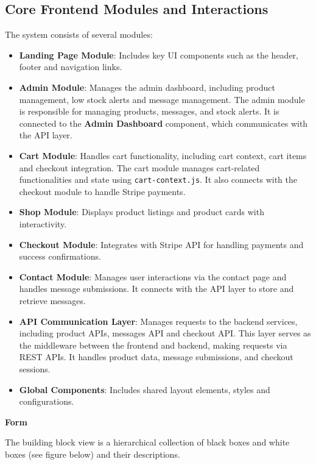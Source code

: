 \subsection{Core Frontend Modules and Interactions}
The system consists of several modules:
\begin{itemize}
    \item \textbf{Landing Page Module}: Includes key UI components such as the header, footer and navigation links.
    \item \textbf{Admin Module}: Manages the admin dashboard, including product management, low stock alerts and message management. The admin module is responsible for managing products, messages, and stock alerts. It is connected to the \textbf{Admin Dashboard} component, which communicates with the API layer.
    \item \textbf{Cart Module}: Handles cart functionality, including cart context, cart items and checkout integration. The cart module manages cart-related functionalities and state using \texttt{cart-context.js}. It also connects with the checkout module to handle Stripe payments.
    \item \textbf{Shop Module}: Displays product listings and product cards with interactivity.
    \item \textbf{Checkout Module}: Integrates with Stripe API for handling payments and success confirmations.
    \item \textbf{Contact Module}: Manages user interactions via the contact page and handles message submissions. It connects with the API layer to store and retrieve messages.
    \item \textbf{API Communication Layer}: Manages requests to the backend services, including product APIs, messages API and checkout API. This layer serves as the middleware between the frontend and backend, making requests via REST APIs. It handles product data, message submissions, and checkout sessions.
    \item \textbf{Global Components}: Includes shared layout elements, styles and configurations.
\end{itemize}




\textbf{Form}

The building block view is a hierarchical collection of black boxes and
white boxes (see figure below) and their descriptions.

